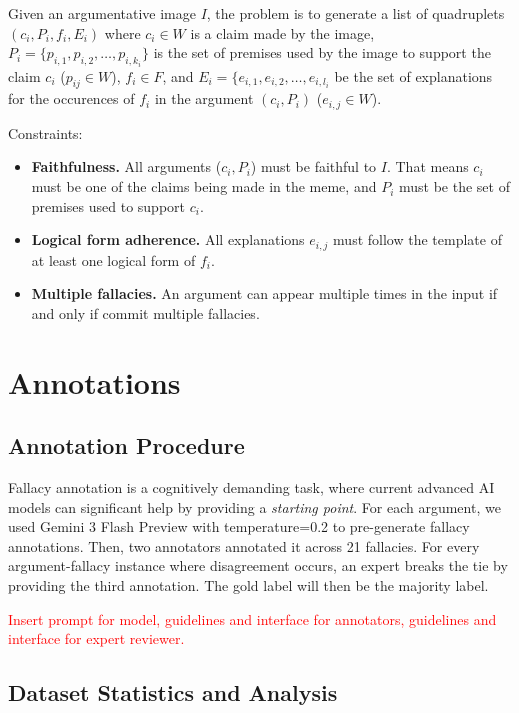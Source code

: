 \documentclass[11pt]{article}
\newcommand{\red}[1]{\textcolor{red}{#1}}
\begin{document}
Given an argumentative image $I$, the problem is to generate a list of quadruplets $(c_i, P_i, f_i, E_i)$ where $c_i \in W$ is a claim made by the image, $P_i = \{p_{i,1}, p_{i,2}, \ldots, p_{i,k_i}\}$ is the set of premises used by the image to support the claim $c_i$ ($p_{ij} \in W$), $f_i \in F$, and $E_i = \{e_{i,1}, e_{i,2}, \ldots, e_{i,l_i}$ be the set of explanations for the occurences of $f_i$ in the argument $(c_i, P_i)$ ($e_{i, j} \in W$).

Constraints:
\begin{itemize}
  \item {\bf Faithfulness.} All arguments ($c_i, P_i$) must be faithful to $I$. That means $c_i$ must be one of the claims being made in the meme, and $P_i$ must be the set of premises used to support $c_i$. 
  \item {\bf Logical form adherence.} All explanations $e_{i, j}$ must follow the template of at least one logical form of $f_i$.
  \item {\bf Multiple fallacies.} An argument can appear multiple times in the input if and only if commit multiple fallacies.
\end{itemize}



\section{Annotations}

\subsection{Annotation Procedure}

Fallacy annotation is a cognitively demanding task, where current advanced AI models can significant help by providing a {\it starting point}. For each argument, we used Gemini 3 Flash Preview with temperature=0.2 to pre-generate fallacy annotations. Then, two annotators annotated it across 21 fallacies. For every argument-fallacy instance where disagreement occurs, an expert breaks the tie by providing the third annotation. The gold label will then be the majority label.

\red{Insert prompt for model, guidelines and interface for annotators, guidelines and interface for expert reviewer.}

\subsection{Dataset Statistics and Analysis}
\end{document}
